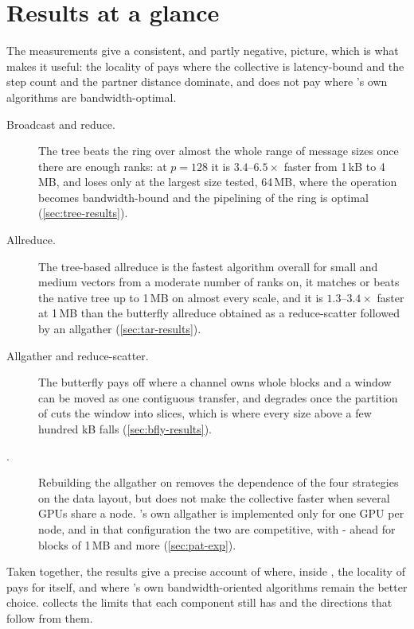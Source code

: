 \section{Results at a glance}\label{sec:intro-results}

The measurements give a consistent, and partly negative, picture, which is what makes it useful: the locality of \bine{} pays where the collective is latency-bound and the step count and the partner distance dominate, and does not pay where \nccl{}'s own algorithms are bandwidth-optimal.

\begin{description}
  \item[Broadcast and reduce.] The \bine{} tree beats the ring over almost the whole range of message sizes once there are enough ranks: at $p=128$ it is $3.4$--$6.5\times$ faster from 1\,kB to 4\,MB, and loses only at the largest size tested, 64\,MB, where the operation becomes bandwidth-bound and the pipelining of the ring is optimal (\cref{sec:tree-results}).
  \item[Allreduce.] The tree-based allreduce is the fastest algorithm overall for small and medium vectors from a moderate number of ranks on, it matches or beats the native \nccl{} tree up to 1\,MB on almost every scale, and it is $1.3$--$3.4\times$ faster at 1\,MB than the butterfly allreduce obtained as a reduce-scatter followed by an allgather (\cref{sec:tar-results}).
  \item[Allgather and reduce-scatter.] The butterfly pays off where a channel owns whole blocks and a window can be moved as one contiguous transfer, and degrades once the partition of \nccl{} cuts the window into slices, which is where every size above a few hundred kB falls (\cref{sec:bfly-results}).
  \item[\pat{}.] Rebuilding the allgather on \pat{} removes the dependence of the four strategies on the data layout, but does not make the collective faster when several GPUs share a node. \nccl{}'s own \pat{} allgather is implemented only for one GPU per node, and in that configuration the two are competitive, with \bine{}-\pat{} ahead for blocks of 1\,MB and more (\cref{sec:pat-exp}).
\end{description}

Taken together, the results give a precise account of where, inside \nccl{}, the locality of \bine{} pays for itself, and where \nccl{}'s own bandwidth-oriented algorithms remain the better choice.
 collects the limits that each component still has and the directions that follow from them.


